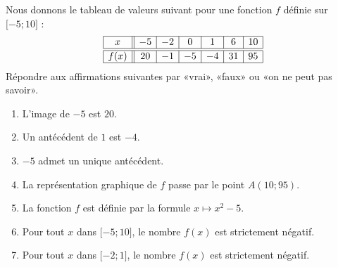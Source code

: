 
\begin{exercice}\label{exosmath-0553}

    Nous donnons le tableau de valeurs suivant pour une fonction \( f\) définie sur \( \mathopen[ -5 ;10 \mathclose]\) :
    \begin{equation*}
        \begin{array}[]{|c||c|c|c|c|c|c|}
            \hline
            x&-5&-2&0&1&6&10\\
            \hline\hline
            f(x)&20&-1&-5&-4&31&95\\
            \hline
        \end{array}
    \end{equation*}
    Répondre aux affirmations suivantes par «vrai», «faux» ou «on ne peut pas savoir».
    \begin{enumerate}
        \item
            L'image de \( -5\) est \( 20\).
        \item
            Un antécédent de \( 1\) est \( -4\).
        \item
            \( -5\) admet un unique antécédent.
        \item
            La représentation graphique de \( f\) passe par le point \( A(10;95)\).
        \item
            La fonction \( f\) est définie par la formule \( x\mapsto x^2-5\).
        \item
            Pour tout \( x\) dans \( \mathopen[ -5 ;10 \mathclose]\), le nombre \( f(x)\) est strictement négatif.
        \item
            Pour tout \( x\) dans \( \mathopen[ -2 ;1 \mathclose]\), le nombre \( f(x)\) est strictement négatif.
    \end{enumerate}

\end{exercice}
